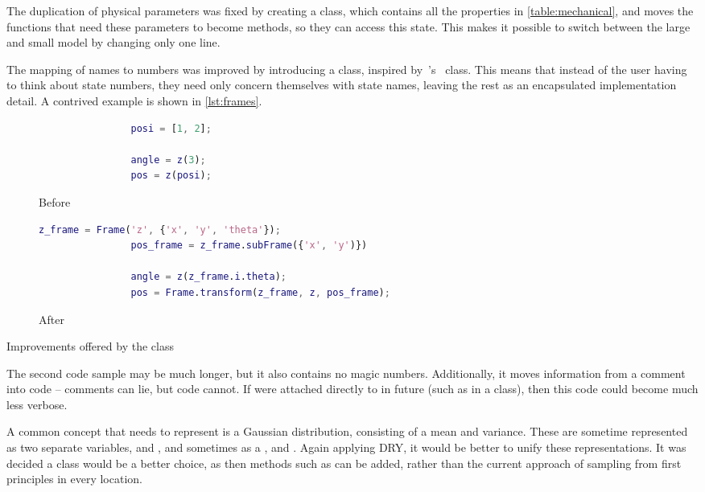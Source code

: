 \documentclass[main.tex]{subfiles}
\begin{document}
	The duplication of physical parameters was fixed by creating a  class, which contains all the properties in \cref{table:mechanical}, and moves the functions that need these parameters to become methods, so they can access this state.
	This makes it possible to switch between the large and small model by changing only one line.

	The mapping of names to numbers was improved by introducing a  class, inspired by~'s~\cite{drake}  class.
	This means that instead of the user having to think about state numbers, they need only concern themselves with state names, leaving the rest as an encapsulated implementation detail.
	A contrived example is shown in \cref{lst:frames}.

	\begin{listingfloat}
		\centering
		\begin{subfigure}{0.4\linewidth-1em}
			\begin{lstlisting}[language=matlab,frame=single,gobble=8]
				% coords are x, y, theta
				posi = [1, 2];

				angle = z(3);
				pos = z(posi);
			\end{lstlisting}
			\caption{Before}
		\end{subfigure}
		\hfill
		\begin{subfigure}{0.6\linewidth-1em}
			\begin{lstlisting}[language=matlab,frame=single,gobble=8]
				z_frame = Frame('z', {'x', 'y', 'theta'});
				pos_frame = z_frame.subFrame({'x', 'y')})

				angle = z(z_frame.i.theta);
				pos = Frame.transform(z_frame, z, pos_frame);
			\end{lstlisting}
			\caption{After}
		\end{subfigure}
		\caption{Improvements offered by the  class}
		\label{lst:frames}
		\medskip
		\small
		The second code sample may be much longer, but it also contains no magic numbers.
		Additionally, it moves information from a comment into code -- comments can lie, but code cannot.
		If  were attached directly to  in future (such as in a  class), then this code could become much less verbose.
	\end{listingfloat}

	A common concept that {\Pilco} needs to represent is a Gaussian distribution, consisting of a mean and variance.
	These are sometime represented as two separate variables,  and , and sometimes as a ,  and .
	Again applying DRY, it would be better to unify these representations.
	It was decided a class would be a better choice, as then methods such as  can be added, rather than the current approach of sampling from first principles in every location.
\end{document}
